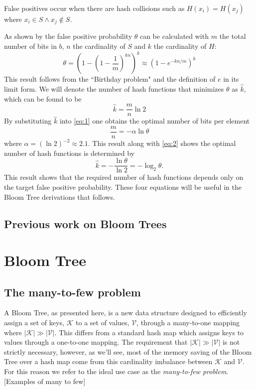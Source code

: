 \documentclass[12pt]{article}
\begin{document}
False positives occur when there are hash collisions such as $H(x_i) = H(x_j)$ where $x_i \in S \land x_j \notin S$. 

As shown by \cite{?} the false positive probability $\theta$ can be calculated with $m$ the total number of bits in $b$, $n$ the cardinality of $S$ and $k$ the cardinality of $H$:  
\begin{equation} \label{eq:1}
\theta = \left( 1 - \left( 1 - \frac{1}{m} \right)^{kn} \right)^k \approx \left(1 - e^{-kn/m} \right)^k 
\end{equation}
This result follows from the ``Birthday problem" and the definition of $e$ in its limit form.  We will denote the number of hash functions that minimizes $\theta$ as $\hat{k}$, which can be found to be
\begin{equation} \label{eq:2}
\hat{k} =  \frac{m}{n} \ln 2
\end{equation} 
By substituting $\hat{k}$ into \ref{eq:1} one obtains the optimal number of bits per element
\begin{equation} \label{eq:3}
\frac{m}{n} = - \alpha \ln \theta
\end{equation}
where $\alpha = (\ln 2)^{-2} \approx 2.1$. This result along with \ref{eq:2} shows the optimal number of hash functions is determined by 
\begin{equation} \label{eq:4}
\hat{k} = - \frac{\ln \theta}{\ln 2} = - \log_2 \theta.
\end{equation} 
This result shows that the required number of hash functions depends only on the target false positive probability.  These four equations will be useful in the Bloom Tree derivations that follows. 


\subsection*{Previous work on Bloom Trees}

\section*{Bloom Tree}



\subsection*{The many-to-few problem}
A Bloom Tree, as presented here, is a new data structure designed to efficiently assign a set of keys, $\mathcal{K}$ to a set of values, $\mathcal{V}$, through a many-to-one mapping where $|\mathcal{K}|  \gg |\mathcal{V}|$. This differs from a standard hash map which assigns keys to values through a one-to-one mapping. The requirement that  $|\mathcal{K}|  \gg |\mathcal{V}|$ is not strictly necessary, however, as we'll see, most of the memory saving of the Bloom Tree over a hash map come from this cardinality imbalance between $\mathcal{K}$ and $\mathcal{V}$. For this reason we refer to the ideal use case as the \emph{many-to-few problem}. 
[Examples of many to few] 
\end{document}
